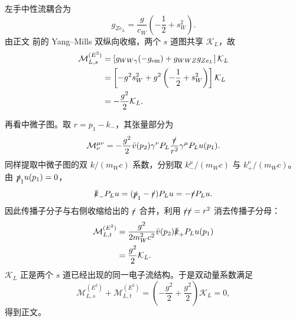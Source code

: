 \begin{derivation}

左手中性流耦合为
\begin{equation*}
g_{Ze_L}=\frac g{c_W}\left(-\frac12+s_W^2\right).
\end{equation*}
由正文 前的 Yang--Mills 双纵向收缩，两个 $s$ 道图共享 $\mathcal K_L$，故
\begin{align*}
\mathcal M_{L,s}^{(E^2)}
&=\left[g_{WW\gamma}(-g_{\rm em})+g_{WWZ}g_{Ze_L}\right]\mathcal K_L\\
&=\left[-g^2s_W^2+g^2\left(-\frac12+s_W^2\right)\right]\mathcal K_L\\
&=-\frac{g^2}{2}\mathcal K_L.
\end{align*}

再看中微子图。取 $r=p_1-k_-$，其张量部分为
\begin{equation*}
\mathcal M_\nu^{\mu\nu}
=-\frac{g^2}{2}\bar v(p_2)\gamma^\nu P_L
\frac{\slashed r}{r^2}\gamma^\mu P_Lu(p_1).
\end{equation*}
同样提取中微子图的双 $k/(m_Wc)$ 系数，分别取 $k_-^\mu/(m_Wc)$ 与 $k_+^\nu/(m_Wc)$。由 $\slashed p_1u(p_1)=0$，
\begin{equation*}
\slashed k_-P_Lu=(\slashed p_1-\slashed r)P_Lu
=-\slashed rP_Lu.
\end{equation*}
因此传播子分子与右侧收缩给出的 $\slashed r$ 合并，利用 $\slashed r\slashed r=r^2$ 消去传播子分母：
\begin{align*}
\mathcal M_{L,t}^{(E^2)}
&=\frac{g^2}{2m_W^2c^2}
\bar v(p_2)\slashed k_+P_Lu(p_1)\\
&=\frac{g^2}{2}\mathcal K_L.
\end{align*}
$\mathcal K_L$ 正是两个 $s$ 道已经出现的同一电子流结构。于是双动量系数满足
\begin{equation*}
\mathcal M_{L,s}^{(E^2)}+\mathcal M_{L,t}^{(E^2)}
=\left(-\frac{g^2}{2}+\frac{g^2}{2}\right)\mathcal K_L=0,
\end{equation*}
得到正文。
\end{derivation}
